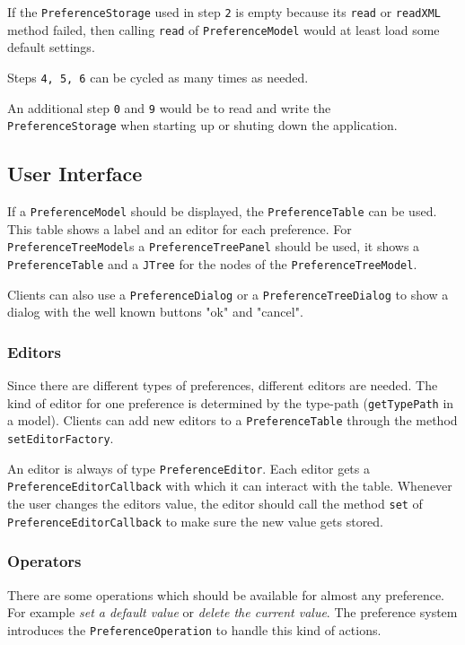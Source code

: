 \documentclass[a4paper,10pt]{article}
\newcommand{\src}[1]{\lstinline[basicstyle=\normalsize\ttfamily,keywordstyle=\normalsize\ttfamily,identifierstyle=\normalsize\ttfamily]|#1|}
\begin{document}
If the \src{PreferenceStorage} used in step \src{2} is empty because its \src{read} or \src{readXML} method failed, then calling \src{read} of \src{PreferenceModel} would at least load some default settings.

Steps \src{4, 5, 6} can be cycled as many times as needed.

An additional step \src{0} and \src{9} would be to read and write the \\\src{PreferenceStorage} when starting up or shuting down the application.

\subsection{User Interface}
If a \src{PreferenceModel} should be displayed, the \src{PreferenceTable} can be used. This table shows a label and an editor for each preference. For \\\src{PreferenceTreeModel}s a \src{PreferenceTreePanel} should be used, it shows a \\\src{PreferenceTable} and a \src{JTree} for the nodes of the \src{PreferenceTreeModel}.

Clients can also use a \src{PreferenceDialog} or a \src{PreferenceTreeDialog} to show a dialog with the well known buttons "ok" and "cancel".

\subsubsection{Editors}
Since there are different types of preferences, different editors are needed. The kind of editor for one preference is determined by the type-path (\src{getTypePath} in a model). Clients can add new editors to a \src{PreferenceTable} through the method \src{setEditorFactory}.

An editor is always of type \src{PreferenceEditor}. Each editor gets a \\\src{PreferenceEditorCallback} with which it can interact with the table. Whenever the user changes the editors value, the editor should call the method \src{set} of \src{PreferenceEditorCallback} to make sure the new value gets stored.

\subsubsection{Operators}
There are some operations which should be available for almost any preference. For example \textit{set a default value} or \textit{delete the current value}. The preference system introduces the \src{PreferenceOperation} to handle this kind of actions.
\end{document}
